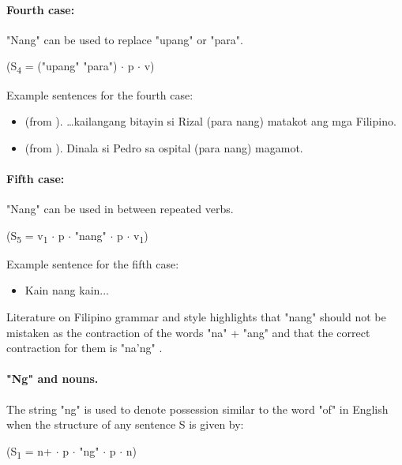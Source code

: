 \paragraph{Fourth case:} "Nang" can be used to replace "upang" or "para".
\begin{center}
      (S\textsubscript{4} = ("upang" {\textpipe} "para") \(\cdot\) p \(\cdot\) v)
\end{center}

\begin{example}
      Example sentences for the fourth case:
\end{example}
\begin{itemize}
      \item (from \cite{OOP}). …kailangang bitayin si Rizal (para {\textpipe} nang)
            matakot ang mga Filipino.
      \item (from \cite{OOP}). Dinala si Pedro sa ospital (para {\textpipe} nang)
            magamot.
\end{itemize}

\paragraph{Fifth case:} "Nang" can be used in between repeated verbs.
\begin{center}
      (S\textsubscript{5} = v\textsubscript{1} \(\cdot\) p \(\cdot\) "nang"
      \(\cdot\) p \(\cdot\) v\textsubscript{1})
\end{center}

\begin{example}
      Example sentence for the fifth case:
\end{example}
\begin{itemize}
      \item Kain nang kain...
\end{itemize}

Literature on Filipino grammar and style highlights that "nang" should not be
mistaken as the contraction of the words "na" + "ang" and that the correct
contraction for them is "na'ng" \cite{OOP}.

\paragraph{"Ng" and nouns.} The string "ng" is used to denote possession similar to
the word "of" in English when the structure of any sentence S is given by:

\begin{center}
      (S\textsubscript{1} = n+ \(\cdot\) p \(\cdot\) "ng" \(\cdot\) p \(\cdot\) n)
\end{center}


